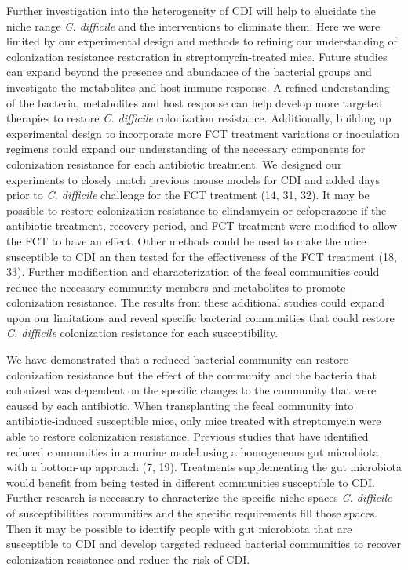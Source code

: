 \documentclass[
  12pt,
]{article}
\begin{document}
Further investigation into the heterogeneity of CDI will help to
elucidate the niche range \emph{C. difficile} and the interventions to
eliminate them. Here we were limited by our experimental design and
methods to refining our understanding of colonization resistance
restoration in streptomycin-treated mice. Future studies can expand
beyond the presence and abundance of the bacterial groups and
investigate the metabolites and host immune response. A refined
understanding of the bacteria, metabolites and host response can help
develop more targeted therapies to restore \emph{C. difficile}
colonization resistance. Additionally, building up experimental design
to incorporate more FCT treatment variations or inoculation regimens
could expand our understanding of the necessary components for
colonization resistance for each antibiotic treatment. We designed our
experiments to closely match previous mouse models for CDI and added
days prior to \emph{C. difficile} challenge for the FCT treatment (14,
31, 32). It may be possible to restore colonization resistance to
clindamycin or cefoperazone if the antibiotic treatment, recovery
period, and FCT treatment were modified to allow the FCT to have an
effect. Other methods could be used to make the mice susceptible to CDI
an then tested for the effectiveness of the FCT treatment (18, 33).
Further modification and characterization of the fecal communities could
reduce the necessary community members and metabolites to promote
colonization resistance. The results from these additional studies could
expand upon our limitations and reveal specific bacterial communities
that could restore \emph{C. difficile} colonization resistance for each
susceptibility.

We have demonstrated that a reduced bacterial community can restore
colonization resistance but the effect of the community and the bacteria
that colonized was dependent on the specific changes to the community
that were caused by each antibiotic. When transplanting the fecal
community into antibiotic-induced susceptible mice, only mice treated
with streptomycin were able to restore colonization resistance. Previous
studies that have identified reduced communities in a murine model using
a homogeneous gut microbiota with a bottom-up approach (7, 19).
Treatments supplementing the gut microbiota would benefit from being
tested in different communities susceptible to CDI. Further research is
necessary to characterize the specific niche spaces \emph{C. difficile}
of susceptibilities communities and the specific requirements fill those
spaces. Then it may be possible to identify people with gut microbiota
that are susceptible to CDI and develop targeted reduced bacterial
communities to recover colonization resistance and reduce the risk of
CDI.
\end{document}
